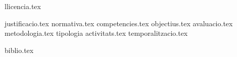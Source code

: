 \documentclass[a4paper,12pt,oneside]{book}  {preamble}
\begin{document}
\frontmatter
\maketitle

 {llicencia.tex}
\tableofcontents

\mainmatter
 {justificacio.tex}
 {normativa.tex}
 {competencies.tex}
 {objectius.tex}
 {avaluacio.tex}
 {metodologia.tex}
 {tipologia}
 {activitats.tex}
 {temporalitzacio.tex}

\backmatter
 {biblio.tex}
\end{document}
